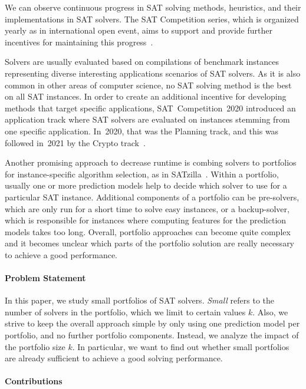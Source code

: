 \documentclass[conference]{IEEEtran}
\begin{document}
We can observe continuous progress in SAT solving methods, heuristics, and their implementations in SAT solvers. 
The SAT Competition series, which is organized yearly as in international open event, aims to support and provide further incentives for maintaining this progress~\cite{balyo2020proceedings}. 

Solvers are usually evaluated based on compilations of benchmark instances representing diverse interesting applications scenarios of SAT solvers. 
As it is also common in other areas of computer science, no SAT solving method is the best on all SAT instances. 
In order to create an additional incentive for developing methods that target specific applications, SAT~Competition~2020 introduced an application track where SAT solvers are evaluated on instances stemming from one specific application. 
In~2020, that was the Planning track, and this was followed in~2021 by the Crypto track~\cite{SC2020:AIJ}. 

Another promising approach to decrease runtime is combing solvers to portfolios for instance-specific algorithm selection, as in SATzilla~\cite{xu2008satzilla, xu2012satzilla2012}. 
Within a portfolio, usually one or more prediction models help to decide which solver to use for a particular SAT instance. 
Additional components of a portfolio can be pre-solvers, which are only run for a short time to solve easy instances, or a backup-solver, which is responsible for instances where computing features for the prediction models takes too long.
Overall, portfolio approaches can become quite complex and it becomes unclear which parts of the portfolio solution are really necessary to achieve a good performance.

\paragraph{Problem Statement}

In this paper, we study small portfolios of SAT solvers.
\emph{Small} refers to the number of solvers in the portfolio, which we limit to certain values $k$.
Also, we strive to keep the overall approach simple by only using one prediction model per portfolio, and no further portfolio components. 
Instead, we analyze the impact of the portfolio size $k$. 
In particular, we want to find out whether small portfolios are already sufficient to achieve a good solving performance. 

\paragraph{Contributions}
\end{document}
